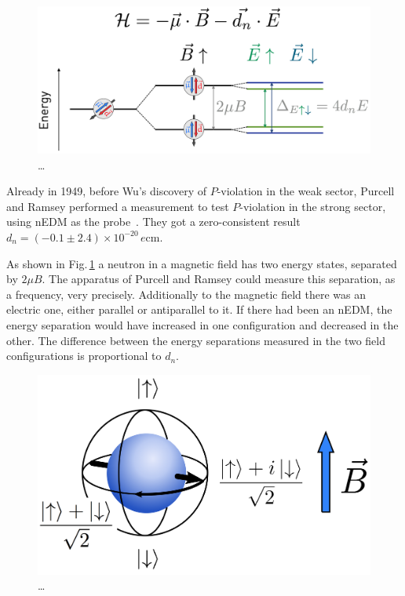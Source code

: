 \begin{figure}
  \centering
  \includegraphics[width=\linewidth]{gfx/nEDMatPSI/measurement_principle.png}
  \caption{\ldots}
  \label{fig:nEDM_measurement_principle}
\end{figure}

Already in 1949, before Wu's discovery of $P$-violation in the weak sector, Purcell and Ramsey performed a measurement to test $P$-violation in the strong sector, using nEDM as the probe~\cite{PhysRev.108.120}. They got a zero-consistent result $d_n = (-0.1 \pm 2.4) \times 10^{-20}\,\si{\elementarycharge\centi\meter}$.

As shown in Fig.\,\ref{fig:nEDM_measurement_principle} a neutron in a magnetic field has two energy states, separated by $2 \mu B$. The apparatus of Purcell and Ramsey could measure this separation, as a frequency, very precisely. Additionally to the magnetic field there was an electric one, either parallel or antiparallel to it. If there had been an nEDM, the energy separation would have increased in one configuration and decreased in the other. The difference between the energy separations measured in the two field configurations is proportional to $d_n$.

\begin{figure}
  \centering
  \includegraphics[width=.6\linewidth]{gfx/nEDMatPSI/bloch_sphere.png}
  \caption{\ldots}
  \label{fig:nEDM_bloch_sphere}
\end{figure}


